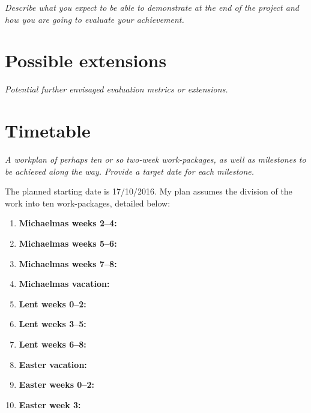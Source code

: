 \documentclass[11pt]{scrartcl}
\begin{document}
\emph{Describe what you expect to be able to demonstrate at the
end of the project and how you are going to evaluate your achievement.}


\section*{Possible extensions}

{\em Potential further envisaged evaluation metrics or extensions.}


\section*{Timetable}

\emph{A workplan of perhaps ten or so two-week work-packages,
as well as milestones to be achieved along the way. Provide a
target date for each milestone.}

The planned starting date is 17/10/2016. My plan assumes the division of the work into ten work-packages, detailed below:

\begin{enumerate}

\item \textbf{Michaelmas weeks 2--4:}

\item \textbf{Michaelmas weeks 5--6:}

\item \textbf{Michaelmas weeks 7--8:}

\item \textbf{Michaelmas vacation:}

\item \textbf{Lent weeks 0--2:}

\item \textbf{Lent weeks 3--5:} 

\item \textbf{Lent weeks 6--8:}

\item \textbf{Easter vacation:} 

\item \textbf{Easter weeks 0--2:}

\item \textbf{Easter week 3:} 

\end{enumerate}
\end{document}
